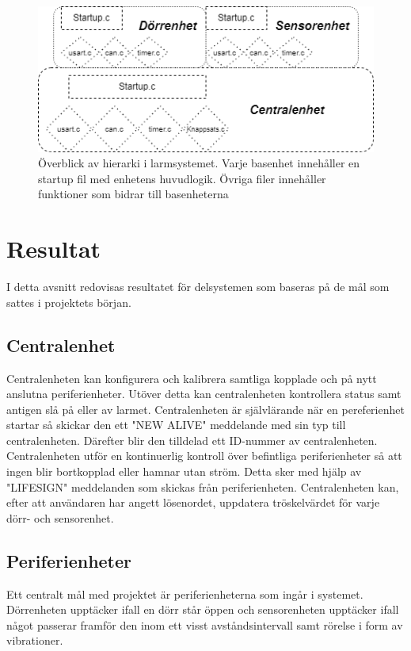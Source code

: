 \documentclass{article}
\begin{document}
\begin{figure}[h]
    \centering
    \includegraphics[scale=0.5]{Projektrapport/hierarki.png}
    \caption {Överblick av hierarki i larmsystemet. Varje basenhet innehåller en startup fil med enhetens huvudlogik. Övriga filer innehåller funktioner som bidrar till basenheterna}
    \label{fig:drawing}
\end{figure}


\section{Resultat}
I detta avsnitt redovisas resultatet för delsystemen som baseras på de mål som sattes i projektets början.\\
\subsection{Centralenhet}
Centralenheten kan konfigurera och kalibrera samtliga kopplade och på nytt anslutna periferienheter.
Utöver detta kan centralenheten kontrollera status samt antigen slå på eller av larmet. 
Centralenheten är självlärande när en pereferienhet startar så skickar den ett "NEW ALIVE" meddelande med sin typ till centralenheten. 
Därefter blir den tilldelad ett ID-nummer av centralenheten. 
Centralenheten utför en kontinuerlig kontroll över befintliga periferienheter så att ingen blir bortkopplad eller hamnar utan ström. 
Detta sker med hjälp av "LIFESIGN" meddelanden som skickas från periferienheten. 
Centralenheten kan, efter att användaren har angett lösenordet, uppdatera tröskelvärdet för varje dörr- och sensorenhet. 

\subsection{Periferienheter}
Ett centralt mål med projektet är periferienheterna som ingår i systemet. 
Dörrenheten upptäcker ifall en dörr står öppen och sensorenheten upptäcker ifall något passerar framför den inom ett visst avståndsintervall samt rörelse i form av vibrationer.
\end{document}
